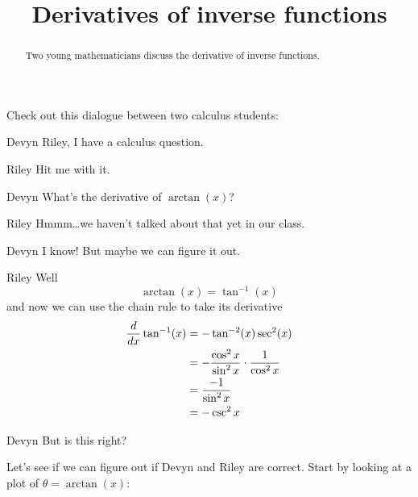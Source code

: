 \documentclass{ximera}
\title[Break-Ground:]{Derivatives of inverse functions}
\begin{document}
\begin{abstract}
Two young mathematicians discuss the derivative of inverse functions.
\end{abstract}
\maketitle

Check out this dialogue between two calculus students:

\begin{dialogue}
\item[Devyn] Riley, I have a calculus question.
\item[Riley] Hit me with it.
\item[Devyn] What's the derivative of $\arctan(x)$?
\item[Riley] Hmmm\dots we haven't talked about that yet in our class.
\item[Devyn] I know! But maybe we can figure it out.
\item[Riley] Well
  \[
  \arctan(x) = \tan^{-1}(x)
  \]
  and now we can use the chain rule to take its derivative
  \begin{align*}
    \frac{d}{dx} \tan^{-1}(x) &= -\tan^{-2}(x)\sec^2(x)\\
    &= -\frac{\cos^2x}{\sin^2x}\cdot \frac{1}{\cos^2x}\\
    &= \frac{-1}{\sin^2x}\\
    &= -\csc^2x
  \end{align*}
\item[Devyn] But is this right?
\end{dialogue}

Let's see if we can figure out if Devyn and Riley are correct. Start by looking at a plot of $\theta = \arctan(x)$:
\end{document}
